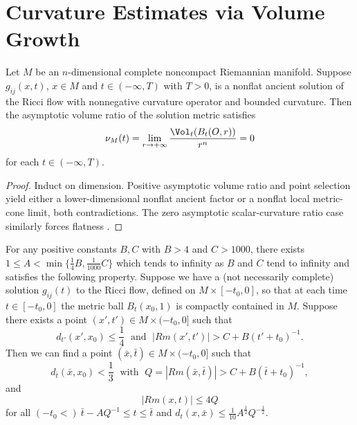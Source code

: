 \section{Curvature Estimates via Volume Growth}
\begin{lemma} 
  \label{lem:cz-ancient-solution-asymptotic-volume-ratio-zero}

Let $M$ be an $n$-dimensional complete noncompact Riemannian
manifold. Suppose $g_{ij}(x,t)$, $x\in M$ and $t\in(-\infty,T)$
with $T>0$, is a nonflat ancient solution of the Ricci flow with
nonnegative curvature operator and bounded curvature. Then the
asymptotic volume ratio of the solution metric satisfies
$$
\nu_M(t)=\lim_{r\rightarrow+\infty}\frac{\Vol_t(B_t(O,r))}{r^n}=0
$$
for each $t\in(-\infty,T)$.
\end{lemma}
\begin{proof}
\sketch Induct on dimension.  Positive asymptotic volume ratio and
point selection yield either a lower-dimensional nonflat ancient factor
or a nonflat local metric-cone limit, both contradictions.  The zero
asymptotic scalar-curvature ratio case similarly forces flatness
\cite{P1}.
\end{proof}
\begin{lemma}
  \label{lem:cz-parabolic-point-picking-curvature-control}

For any positive constants $B, C$ with $B>4$ and $C>1000$, there
exists $1\leq A<\min\{\frac{1}{4}B,\frac{1}{1000}C\}$ which tends
to infinity as $B$ and $C$ tend to infinity and satisfies the
following property. Suppose we have a (not necessarily complete)
solution $g_{ij}(t)$ to the Ricci flow, defined on $M\times
[-t_0,0]$, so that at each time $t\in [-t_0,0]$ the metric ball
$B_t(x_0,1)$ is compactly contained in $M$. Suppose there exists a
point $(x',t') \in M\times (-t_0,0]$ such that
$$
d_{t'}(x',x_0)\leq \frac{1}{4} \; \mbox{ and }\;
|Rm(x',t')|>C+B(t'+t_0)^{-1}.
$$
Then we can find a point $(\bar{x},\bar{t}) \in M\times (-t_0,0]$
such that
$$
d_{\bar{t}}(\bar{x},x_0)<\frac{1}{3}\; \mbox{ with }\; Q
=|Rm(\bar{x},\bar{t})|>C+ B(\bar{t}+t_0)^{-1},
$$
and
$$
|Rm(x,t)|\leq 4Q
$$
for all $(-t_0<) \ \bar{t}-AQ^{-1}\leq t\leq \bar{t}$ and
$d_t(x,\bar{x})\leq \frac{1}{10}A^{\frac{1}{2}}Q^{-\frac{1}{2}}.$
\end{lemma}
